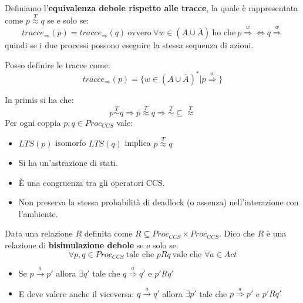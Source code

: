 \begin{definizione}
    Definiamo l'\textbf{equivalenza debole rispetto alle tracce}, la quale è
    rappresentata come $p \stackrel{T}{\approx} q$ se e solo se:
    \begin{equation}
        tracce_{\Rightarrow} (p) = tracce_{\Rightarrow}(q) \ \text{ovvero} \
        \forall w \in (A \cup \overline{A}) \ \text{ho che} \ p
        \stackrel{w}{\Rightarrow} \iff q \stackrel{w}{\Rightarrow}
    \end{equation}
    quindi se i due processi possono eseguire la stessa sequenza di azioni.
\end{definizione}
Posso definire le tracce come:
\begin{equation}
    tracce_{\Rightarrow}(p) = \{w \in (A \cup \overline{A})^{\ast} | p
    \stackrel{w}{\Rightarrow}\}
\end{equation}
\begin{osservazione}
    In primis si ha che:
    \begin{equation}
        p \stackrel{T}{\sim} q \Rightarrow p \stackrel{T}{\approx} q \Rightarrow
        \stackrel{T}{\sim} \subseteq \stackrel{T}{\approx}
    \end{equation}
    Per ogni coppia $p, q \in Proc_{CCS}$ vale:
    \begin{itemize}
        \item $LTS(p)$ isomorfo $LTS(q)$ implica $p \stackrel{T}{\approx} q$
        \item Si ha un'astrazione di stati.
        \item È una congruenza tra gli operatori CCS.
        \item Non preserva la stessa probabilità di deadlock (o assenza)
              nell'interazione con l'ambiente.
    \end{itemize}
\end{osservazione}
\begin{definizione}
    Data una relazione $R$ definita come $R \subseteq Proc_{CCS} \times Proc_{CCS}$.
    Dico che $R$ è una relazione di \textbf{bisimulazione debole} se e solo se:
    \begin{equation}
        \forall p, q \in Proc_{CCS} \ \text{tale che } p R q \ \text{vale che }
        \forall a \in Act
    \end{equation}
    \begin{itemize}
        \item Se $p \xrightarrow{a} p'$ allora $\exists q'$ tale che
              $q \stackrel{a}{\Rightarrow} q'$ e $p'Rq'$
        \item E deve valere anche il viceversa: $q \xrightarrow{a} q'$ allora
              $\exists p'$ tale che $p \stackrel{a}{\Rightarrow} p'$ e $p'Rq'$
    \end{itemize}
\end{definizione}
